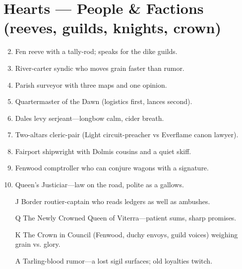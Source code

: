 \section*{Hearts --- People \& Factions (reeves, guilds, knights, crown)}
\label{sec:viterra-people}
\begin{enumerate}
\setcounter{enumi}{1}
\item Fen reeve with a tally-rod; speaks for the dike guilds.
\item River-carter syndic who moves grain faster than rumor.
\item Parish surveyor with three maps and one opinion.
\item Quartermaster of the Dawn (logistics first, lances second).
\item Dales levy serjeant---longbow calm, cider breath.
\item Two-altars cleric-pair (Light circuit-preacher vs Everflame canon lawyer).
\item Fairport shipwright with Dolmis cousins and a quiet skiff.
\item Fenwood comptroller who can conjure wagons with a signature.
\item Queen's Justiciar---law on the road, polite as a gallows.
\item[J] Border routier-captain who reads ledgers as well as ambushes.
\item[Q] The Newly Crowned Queen of Viterra---patient sums, sharp promises.
\item[K] The Crown in Council (Fenwood, duchy envoys, guild voices) weighing grain vs. glory.
\item[A] Tarling-blood rumor---a lost sigil surfaces; old loyalties twitch.
\end{enumerate}

